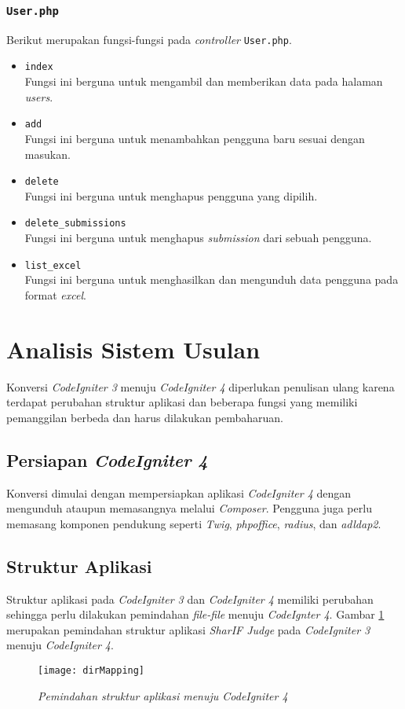 \subsubsection{\texttt{User.php}}
Berikut merupakan fungsi-fungsi pada \textit{controller} \texttt{User.php}.
\begin{itemize}
	\item \texttt{index}\\
	Fungsi ini berguna untuk mengambil dan memberikan data pada halaman \textit{users}.
	\item \texttt{add}\\
	Fungsi ini berguna untuk menambahkan pengguna baru sesuai dengan masukan.
	\item \texttt{delete}\\
	Fungsi ini berguna untuk menghapus pengguna yang dipilih.
	\item \texttt{delete\_submissions}\\
	Fungsi ini berguna untuk menghapus \textit{submission} dari sebuah pengguna.
	\item \texttt{list\_excel}\\
	Fungsi ini berguna untuk menghasilkan dan mengunduh data pengguna pada format \textit{excel}.
\end{itemize}

\section{Analisis Sistem Usulan}
Konversi \textit{CodeIgniter 3} menuju \textit{CodeIgniter 4} diperlukan penulisan ulang karena terdapat perubahan struktur aplikasi dan beberapa fungsi yang memiliki pemanggilan berbeda dan harus dilakukan pembaharuan.
\subsection{Persiapan \textit{CodeIgniter 4}} Konversi dimulai dengan mempersiapkan aplikasi \textit{CodeIgniter 4} dengan mengunduh ataupun memasangnya melalui \textit{Composer}. Pengguna juga perlu memasang komponen pendukung seperti \textit{Twig}, \textit{phpoffice}, \textit{radius}, dan \textit{adldap2}.

\subsection{Struktur Aplikasi}
Struktur aplikasi pada \textit{CodeIgniter 3} dan \textit{CodeIgniter 4} memiliki perubahan sehingga perlu dilakukan pemindahan \textit{file-file} menuju \textit{CodeIgnter 4}. Gambar \ref{fig:dirMapping} merupakan pemindahan struktur aplikasi \textit{SharIF Judge} pada \textit{CodeIgniter 3} menuju \textit{CodeIgniter 4}.
\begin{figure}[H]
	\centering  
	\texttt{[image: dirMapping]}  
	\caption[\textit{Pemindahan struktur aplikasi menuju \textit{CodeIgniter 4}}]{\textit{Pemindahan struktur aplikasi menuju \textit{CodeIgniter 4}}} 
	\label{fig:dirMapping} 
\end{figure} 

